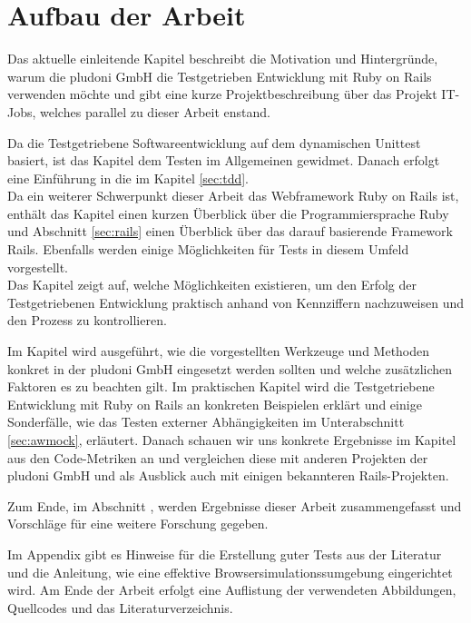 \section{Aufbau der Arbeit}

Das aktuelle einleitende Kapitel beschreibt die Motivation und Hintergründe, warum die pludoni GmbH die Testgetrieben Entwicklung mit Ruby on Rails verwenden möchte und gibt eine kurze Projektbeschreibung über das Projekt IT-Jobs, welches parallel zu dieser Arbeit enstand.

Da die Testgetriebene Softwareentwicklung auf dem dynamischen Unittest basiert, ist das Kapitel  dem Testen im Allgemeinen gewidmet. Danach erfolgt eine Einführung in die \textit{} im Kapitel \ref{sec:tdd}. \\
Da ein weiterer Schwerpunkt dieser Arbeit das Webframework Ruby on Rails ist, enthält das Kapitel  einen kurzen Überblick über die Programmiersprache Ruby und Abschnitt \ref{sec:rails} einen Überblick über das darauf basierende Framework Rails. Ebenfalls werden einige Möglichkeiten für Tests in diesem Umfeld vorgestellt.\\
Das Kapitel  zeigt auf, welche Möglichkeiten existieren, um den Erfolg der Testgetriebenen Entwicklung praktisch anhand von Kennziffern nachzuweisen und den Prozess zu kontrollieren.

Im Kapitel  wird ausgeführt, wie die vorgestellten Werkzeuge und Methoden konkret in der pludoni GmbH eingesetzt werden sollten und welche zusätzlichen Faktoren es zu beachten gilt.
Im praktischen Kapitel  wird die Testgetriebene Entwicklung mit Ruby on Rails an konkreten Beispielen erklärt und einige Sonderfälle, wie das Testen externer Abhängigkeiten im Unterabschnitt \ref{sec:awmock}, erläutert.
Danach schauen wir uns konkrete Ergebnisse im Kapitel  aus den Code-Metriken an und vergleichen diese mit anderen Projekten der pludoni GmbH und als Ausblick auch mit einigen bekannteren Rails-Projekten.

Zum Ende, im Abschnitt , werden Ergebnisse dieser Arbeit zusammengefasst und Vorschläge für eine weitere Forschung gegeben.

Im Appendix gibt es Hinweise für die Erstellung guter Tests aus der Literatur und die Anleitung, wie eine effektive Browsersimulationssumgebung eingerichtet wird. Am Ende der Arbeit erfolgt eine Auflistung der verwendeten Abbildungen, Quellcodes und das Literaturverzeichnis.

